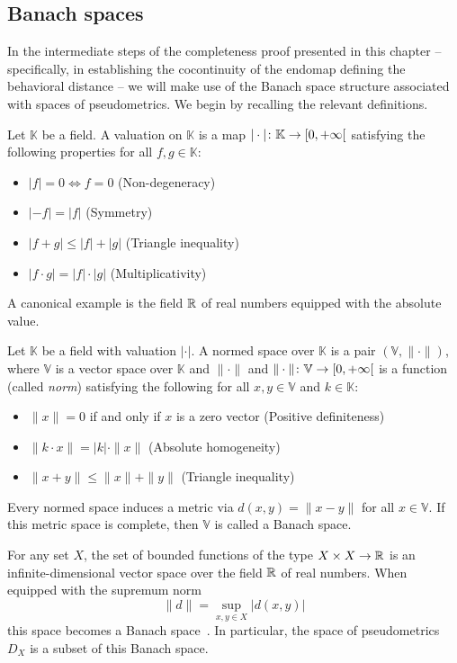 \subsection{Banach spaces}
In the intermediate steps of the completeness proof presented in this chapter --specifically, in establishing the cocontinuity of the endomap defining the behavioral distance -- we will make use of the Banach space structure associated with spaces of pseudometrics. We begin by recalling the relevant definitions.
\begin{definition}
	Let $\mathbb{K}$ be a field. A valuation on $\mathbb{K}$ is a map $|\cdot| \colon \mathbb{K} \to \interval[open right]{0}{+\infty}$  satisfying the following properties for all $f,g \in \mathbb{K}$:
	\begin{itemize}
		\item $|f|=0 \iff f = 0$ (Non-degeneracy)
		\item $|-f|=|f|$ (Symmetry)
		\item $|f + g| \leq |f| + |g|$ (Triangle inequality)
		\item $|f \cdot g| = |f| \cdot |g|$ (Multiplicativity)
	\end{itemize}
\end{definition}
A canonical example is the field $\mathbb{R}$ of real numbers equipped with the absolute value.
\begin{definition}
	Let $\mathbb{K}$ be a field with valuation $|\cdot |$. A normed space over $\mathbb{K}$ is a pair $(\mathbb{V}, \| \cdot\|)$, where $\mathbb{V}$ is a vector space over $\mathbb{K}$ and $\| \cdot \|$ and $\| \cdot \| \colon \mathbb{V} \to \interval[open right]{0}{+\infty}$ is a function (called \emph{norm}) satisfying the following for all $x, y \in \mathbb{V}$ and $k \in \mathbb{K}$: 
	\begin{itemize}
		\item $\| x \| = 0$ if and only if $x$ is a zero vector (Positive definiteness)
		\item $\| k \cdot x\|=|k| \cdot \|x\|$ (Absolute homogeneity) 
		\item $\|x + y\| \leq \|x\| + \|y\|$ (Triangle inequality)
	\end{itemize}
	Every normed space induces a metric via $d(x,y)=\|x-y\|$ for all $x \in \mathbb{V}$. If this metric space is complete, then $\mathbb{V}$ is called a Banach space.
\end{definition}
For any set $X$, the set of bounded functions of the type $X \times X \to \mathbb{R}$ is an infinite-dimensional vector space over the field $\mathbb{R}$ of real numbers. When equipped with the supremum norm $$\|d\| = \sup_{x,y \in X} |d(x,y)|$$
this space becomes a Banach space~\cite{Breugel:2012:Closure}.  In particular, the space of pseudometrics $D_X$ is a subset of this Banach space.
